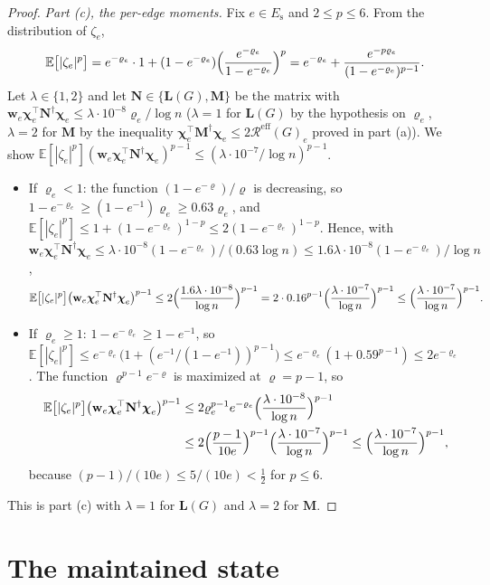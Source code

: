 \documentclass[11pt]{article}
\theoremstyle{remark}
\newcommand{\cchi}{{\boldsymbol\chi}}
\newcommand{\LL}{\mathbf L}
\newcommand{\MM}{\mathbf M}
\newcommand{\NN}{\mathbf N}
\newcommand{\ww}{\mathbf w}
\newcommand{\Rcal}{\mathcal{R}}
\newcommand{\Reff}{\Rcal^{\mathrm{eff}}}
\newcommand{\Ex}{\mathbb E}
\begin{document}
\begin{proof}
\emph{Part (c), the per-edge moments.}
Fix $e\in E_{\mathrm{s}}$ and $2\le p\le6$.
From the distribution of $\zeta_e$,
\[
\Ex\bigl[|\zeta_e|^{p}\bigr]
=e^{-\varrho_e}\cdot1
+(1-e^{-\varrho_e})\Bigl(\frac{e^{-\varrho_e}}{1-e^{-\varrho_e}}\Bigr)^{p}
=e^{-\varrho_e}+\frac{e^{-p\varrho_e}}{(1-e^{-\varrho_e})^{p-1}} .
\]
Let $\lambda\in\{1,2\}$ and let $\NN\in\{\LL(G),\MM\}$ be the matrix with
$\ww_e\cchi_e^{\top}\NN^{\dag}\cchi_e\le\lambda\cdot10^{-8}\varrho_e/\log n$
($\lambda=1$ for $\LL(G)$ by the hypothesis on $\varrho_e$, $\lambda=2$ for
$\MM$ by the inequality $\cchi_e^{\top}\MM^{\dag}\cchi_e\le2\Reff(G)_e$
proved in part (a)).
We show
$\Ex[|\zeta_e|^{p}](\ww_e\cchi_e^{\top}\NN^{\dag}\cchi_e)^{p-1}
\le(\lambda\cdot10^{-7}/\log n)^{p-1}$.
\begin{itemize}[leftmargin=*]
\item If $\varrho_e<1$: the function $(1-e^{-\varrho})/\varrho$ is
decreasing, so $1-e^{-\varrho_e}\ge(1-e^{-1})\varrho_e\ge0.63\varrho_e$,
and
$\Ex[|\zeta_e|^{p}]\le1+(1-e^{-\varrho_e})^{1-p}\le2(1-e^{-\varrho_e})^{1-p}$.
Hence, with
$\ww_e\cchi_e^{\top}\NN^{\dag}\cchi_e
\le\lambda\cdot10^{-8}(1-e^{-\varrho_e})/(0.63\log n)
\le1.6\lambda\cdot10^{-8}(1-e^{-\varrho_e})/\log n$,
\[
\Ex\bigl[|\zeta_e|^{p}\bigr]
\bigl(\ww_e\cchi_e^{\top}\NN^{\dag}\cchi_e\bigr)^{p-1}
\le2\Bigl(\frac{1.6\lambda\cdot10^{-8}}{\log n}\Bigr)^{p-1}
=2\cdot0.16^{p-1}\Bigl(\frac{\lambda\cdot10^{-7}}{\log n}\Bigr)^{p-1}
\le\Bigl(\frac{\lambda\cdot10^{-7}}{\log n}\Bigr)^{p-1}.
\]
\item If $\varrho_e\ge1$: $1-e^{-\varrho_e}\ge1-e^{-1}$, so
$\Ex[|\zeta_e|^{p}]\le e^{-\varrho_e}\bigl(1+(e^{-1}/(1-e^{-1}))^{p-1}\bigr)
\le e^{-\varrho_e}(1+0.59^{p-1})\le2e^{-\varrho_e}$.
The function $\varrho^{p-1}e^{-\varrho}$ is maximized at $\varrho=p-1$, so
\begin{align*}
\Ex\bigl[|\zeta_e|^{p}\bigr]
\bigl(\ww_e\cchi_e^{\top}\NN^{\dag}\cchi_e\bigr)^{p-1}
&\le2\varrho_e^{p-1}e^{-\varrho_e}
\Bigl(\frac{\lambda\cdot10^{-8}}{\log n}\Bigr)^{p-1}\\
&\le2\Bigl(\frac{p-1}{10e}\Bigr)^{p-1}
\Bigl(\frac{\lambda\cdot10^{-7}}{\log n}\Bigr)^{p-1}
\le\Bigl(\frac{\lambda\cdot10^{-7}}{\log n}\Bigr)^{p-1},
\end{align*}
because $(p-1)/(10e)\le5/(10e)<\frac12$ for $p\le6$.
\end{itemize}
This is part (c) with $\lambda=1$ for $\LL(G)$ and $\lambda=2$ for $\MM$.
\end{proof}

\section{The maintained state}\label{sec:state}
\end{document}
